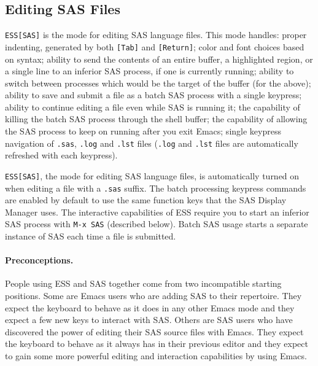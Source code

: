 \documentclass{article}
\newcommand{\stexttt}[1]{{\small\texttt{#1}}}
\begin{document}
\subsection{Editing SAS Files}
\label{sec:SAS:edit}

\stexttt{ESS[SAS]} is the mode for editing SAS language files.  This mode
handles: proper indenting, generated by both \stexttt{[Tab]} and
\stexttt{[Return]}; color and font choices based on syntax; ability to send
the contents of an entire buffer, a highlighted region, or a single
line to an inferior SAS process, if one is currently running; ability
to switch between processes which would be the target of the buffer
(for the above); ability to save and submit a file
as a batch SAS process with a single keypress; ability to continue
editing a file even while SAS is running it;
the capability of killing the batch SAS
process through the shell buffer; the capability of allowing the
SAS process to keep on
running after you exit Emacs; single keypress navigation of \stexttt{.sas},
\stexttt{.log} and \stexttt{.lst} files (\stexttt{.log} and \stexttt{.lst}
files are automatically refreshed with each keypress).

\stexttt{ESS[SAS]}, the mode for editing SAS language files, is automatically
turned on when editing a file with a \stexttt{.sas} suffix.
The batch processing keypress commands are
enabled by default to use the same function keys that the SAS Display
Manager uses.  The interactive capabilities of ESS require you to
start an inferior SAS process with \stexttt{M-x SAS} (described below).
Batch SAS usage starts a separate instance of SAS each time a file is submitted.


\paragraph{Preconceptions.}

People using ESS and SAS together come from two incompatible starting positions.
Some are Emacs users who are adding SAS to their repertoire.  They expect the 
keyboard to behave as it does in any other Emacs mode and they expect a few new
keys to interact with SAS.  Others are SAS users who have discovered the
power of editing their SAS source files with Emacs.  They expect the keyboard
to behave as it always has in their previous editor and they expect to gain some
more powerful editing and interaction capabilities by using Emacs.
\end{document}

